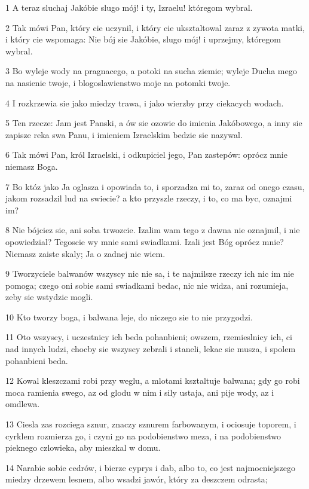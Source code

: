 \par 1 A teraz sluchaj Jakóbie slugo mój! i ty, Izraelu! któregom wybral.
\par 2 Tak mówi Pan, który cie uczynil, i który cie uksztaltowal zaraz z zywota matki, i który cie wspomaga: Nie bój sie Jakóbie, slugo mój! i uprzejmy, któregom wybral.
\par 3 Bo wyleje wody na pragnacego, a potoki na sucha ziemie; wyleje Ducha mego na nasienie twoje, i blogoslawienstwo moje na potomki twoje.
\par 4 I rozkrzewia sie jako miedzy trawa, i jako wierzby przy ciekacych wodach.
\par 5 Ten rzecze: Jam jest Panski, a ów sie ozowie do imienia Jakóbowego, a inny sie zapisze reka swa Panu, i imieniem Izraelskim bedzie sie nazywal.
\par 6 Tak mówi Pan, król Izraelski, i odkupiciel jego, Pan zastepów: oprócz mnie niemasz Boga.
\par 7 Bo któz jako Ja oglasza i opowiada to, i sporzadza mi to, zaraz od onego czasu, jakom rozsadzil lud na swiecie? a kto przyszle rzeczy, i to, co ma byc, oznajmi im?
\par 8 Nie bójciez sie, ani soba trwozcie. Izalim wam tego z dawna nie oznajmil, i nie opowiedzial? Tegoscie wy mnie sami swiadkami. Izali jest Bóg oprócz mnie? Niemasz zaiste skaly; Ja o zadnej nie wiem.
\par 9 Tworzyciele balwanów wszyscy nic nie sa, i te najmilsze rzeczy ich nic im nie pomoga; czego oni sobie sami swiadkami bedac, nic nie widza, ani rozumieja, zeby sie wstydzic mogli.
\par 10 Kto tworzy boga, i balwana leje, do niczego sie to nie przygodzi.
\par 11 Oto wszyscy, i uczestnicy ich beda pohanbieni; owszem, rzemieslnicy ich, ci nad innych ludzi, chocby sie wszyscy zebrali i staneli, lekac sie musza, i spolem pohanbieni beda.
\par 12 Kowal kleszczami robi przy weglu, a mlotami ksztaltuje balwana; gdy go robi moca ramienia swego, az od glodu w nim i sily ustaja, ani pije wody, az i omdlewa.
\par 13 Ciesla zas rozciega sznur, znaczy sznurem farbowanym, i ociosuje toporem, i cyrklem rozmierza go, i czyni go na podobienstwo meza, i na podobienstwo pieknego czlowieka, aby mieszkal w domu.
\par 14 Narabie sobie cedrów, i bierze cyprys i dab, albo to, co jest najmocniejszego miedzy drzewem lesnem, albo wsadzi jawór, który za deszczem odrasta;
